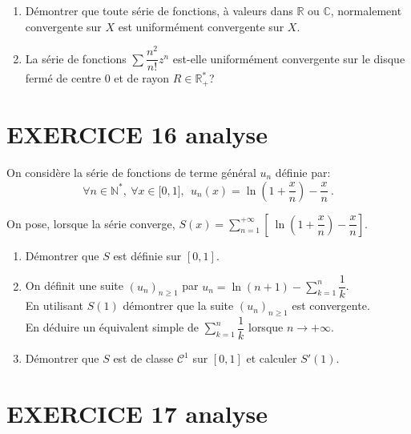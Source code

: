 \documentclass[10pt,oneside]{article}
\begin{document}
\begin{flushleft}
\begin{enumerate}
\item Démontrer que toute s\'{e}rie de fonctions, à valeurs dans $\mathbb{R} $ ou $\mathbb{C} $, normalement convergente sur $X$ est uniform\'{e}ment convergente sur $X$.

\item La s\'{e}rie de fonctions $\displaystyle\sum \dfrac{n^{2}}{n!}z^{n}$ est-elle uniform\'{e}ment convergente sur le disque ferm\'{e} de centre $0$ et de rayon $R\in \mathbb{R}_{+}^{\ast}$?
\end{enumerate}


\section*{EXERCICE 16 \:analyse }

  On consid\`{e}re la s\'{e}rie de fonctions de terme g\'{e}n\'{e}ral $u_{n}$ d\'{e}finie par: 
\begin{equation*}
\forall n\in \mathbb{N}^{*},\ \forall x\in \lbrack 0,1], \ \ u_{n}\left(x\right) =\ln \left( 1+\dfrac{x}{n}\right) -\dfrac{x}{n}~.
\end{equation*}

On pose, lorsque la s\'{e}rie converge, $S(x)=\displaystyle\sum\limits_{n=1}^{+\infty }\left[ \ \ln \left( 1+\dfrac{x}{n}\right) -\dfrac{x}{n}\right]$.

\begin{enumerate}
  \item D\'{e}montrer que $S$ est définie sur $[0,1]$. 

\item On définit une suite $(u_n)_{n\geq 1}$ par $u_n=\ln(n+1)-\displaystyle\sum_{k=1}^n\dfrac{1}{k}$.\\
  En utilisant $S(1)$ démontrer que la suite $(u_n)_{n\geq 1}$ est convergente.\\%
  En déduire un équivalent simple de $\displaystyle\sum_{k=1}^n\dfrac{1}{k}$ lorsque $n\to+\infty$.


\item D\'{e}montrer que $S$ est de classe $\mathcal{C}^1$ sur $[0,1]$ et calculer $S'(1)$. 

\end{enumerate}

\section*{EXERCICE 17 \:analyse }


\end{flushleft}
\end{document}

